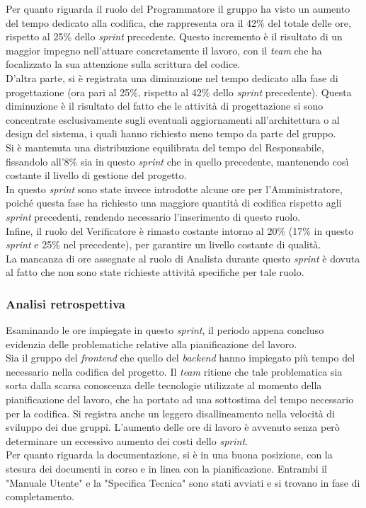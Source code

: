 Per quanto riguarda il ruolo del Programmatore il gruppo ha visto un aumento del tempo dedicato alla codifica, che rappresenta ora il 42\% del totale delle ore,
rispetto al 25\% dello \textit{sprint} precedente. 
Questo incremento è il risultato di un maggior impegno nell'attuare concretamente il lavoro, con il \textit{team} che ha focalizzato la sua attenzione sulla scrittura del codice.\\
D'altra parte, si è registrata una diminuzione nel tempo dedicato alla fase di progettazione (ora pari al 25\%, rispetto al 42\% dello \textit{sprint} precedente). Questa diminuzione è il risultato del fatto che le attività di progettazione si sono concentrate esclusivamente sugli eventuali aggiornamenti all'architettura o al design del sistema, i quali hanno richiesto meno tempo da parte del gruppo. \\
Si è mantenuta una distribuzione equilibrata del tempo del Responsabile, fissandolo all'8\% sia in questo \textit{sprint} che in quello precedente, mantenendo così costante il livello di gestione del progetto.\\
In questo \textit{sprint} sono state invece introdotte alcune ore per l'Amministratore, poiché questa fase ha richiesto una maggiore quantità di codifica rispetto agli \textit{sprint} precedenti, rendendo necessario l'inserimento di questo ruolo.\\
Infine, il ruolo del Verificatore è rimasto costante intorno al 20\% (17\% in questo \textit{sprint} e 25\% nel precedente), per garantire un livello costante di qualità.\\
La mancanza di ore assegnate al ruolo di Analista durante questo \textit{sprint} è dovuta al fatto che non sono state richieste attività specifiche per tale ruolo.

\subsubsection{Analisi retrospettiva}
Esaminando le ore impiegate in questo \textit{sprint}, il periodo appena concluso evidenzia delle problematiche relative alla pianificazione del lavoro.\\
Sia il gruppo del \textit{frontend} che quello del \textit{backend} hanno impiegato più tempo del necessario nella codifica del progetto.
Il \textit{team} ritiene che tale problematica sia sorta dalla scarsa conoscenza delle tecnologie utilizzate al momento della pianificazione del lavoro, che ha portato ad una sottostima del tempo necessario per la codifica.
Si registra anche un leggero disallineamento nella velocità di sviluppo dei due gruppi.
L'aumento delle ore di lavoro è avvenuto senza però determinare un eccessivo aumento dei costi dello \textit{sprint}.\\
Per quanto riguarda la documentazione, si è in una buona posizione, con la stesura dei documenti in corso e in linea con la pianificazione. 
Entrambi il "Manuale Utente" e la "Specifica Tecnica" sono stati avviati e si trovano in fase di completamento.

